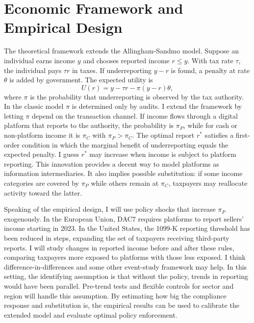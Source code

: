 \documentclass[11pt]{article}
\begin{document}
\section*{Economic Framework and Empirical Design}
The theoretical framework extends the Allingham-Sandmo model. Suppose an individual earns income $y$ and chooses reported income $r \leq y$. With tax rate $\tau$, the individual pays $\tau r$ in taxes. If underreporting $y-r$ is found, a penalty at rate $\theta$ is added by government. The expected utility is
\[
U(r) = y - \tau r - \pi(y-r)\theta,
\]
where $\pi$ is the probability that underreporting is observed by the tax authority. In the classic model $\pi$ is determined only by audits. I extend the framework by letting $\pi$ depend on the transaction channel. If income flows through a digital platform that reports to the authority, the probability is $\pi_P$, while for cash or non-platform income it is $\pi_C$ with $\pi_P > \pi_C$. The optimal report $r^\ast$ satisfies a first-order condition in which the marginal benefit of underreporting equals the expected penalty. I guess $r^\ast$ may increase when income is subject to platform reporting. This innovation provides a decent way to model platforms as information intermediaries. It also implies possible substitution: if some income categories are covered by $\pi_P$ while others remain at $\pi_C$, taxpayers may reallocate activity toward the latter.

Speaking of the empirical design, I will use policy shocks that increase $\pi_P$ exogenously. In the European Union, DAC7 requires platforms to report sellers’ income starting in 2023. In the United States, the 1099-K reporting threshold has been reduced in steps, expanding the set of taxpayers receiving third-party reports. I will study changes in reported income before and after these rules, comparing taxpayers more exposed to platforms with those less exposed. I think difference-in-differences and some other event-study framework may help. In this setting, the identifying assumption is that without the policy, trends in reporting would have been parallel. Pre-trend tests and flexible controls for sector and region will handle this assumption. By estimating how big the compliance response and substitution is, the empirical results can be used to calibrate the extended model and evaluate optimal policy enforcement.
\end{document}
